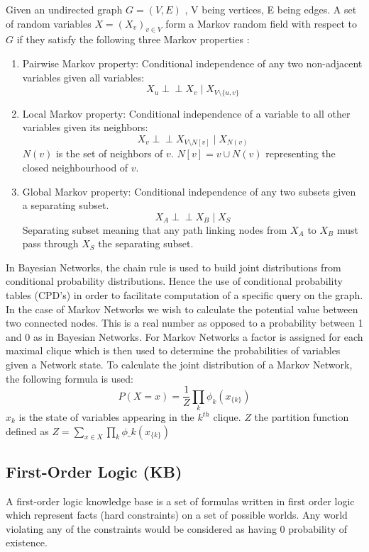 Given an undirected graph \(G = (V,E)\) , V being vertices, E being edges.
A set of random variables \(X = (X_v)_{v\in V}\) form a Markov random field with respect to \(G\) if they satisfy the following three Markov properties \cite{Markovra75:online}:
\begin{enumerate}
\item Pairwise Markov property: Conditional independence of any two non-adjacent variables given all variables: \[X_u \perp\!\!\!\perp X_v \mid X_{V\setminus\{u,v\}}\]
\item Local Markov property: Conditional independence of a variable to all other variables given its neighbors: \[ X_v \perp \!\!\!\perp X_{V\setminus N[v]} \mid X_{N(v)}\] \(N(v)\)  is the set of neighbors of \(v\). \newline\(N[v] = v\cup N(v)\) representing the closed neighbourhood of \(v\).
\item Global Markov property: Conditional independence of any two subsets given a separating subset.
\[X_A \perp \!\!\!\perp X_B \mid X_S \]Separating subset meaning that any path linking nodes from \(X_A\) to \(X_B\) must pass through \(X_S\) the separating subset.
\end{enumerate}

In Bayesian Networks, the chain rule is used to build joint distributions from conditional probability distributions. Hence the use of conditional probability tables (CPD's) in order to facilitate computation of a specific query on the graph. In the case of Markov Networks we wish to calculate the potential value between two connected nodes. This is a real number as opposed to a probability between 1 and 0 as in Bayesian Networks. For Markov Networks a factor is assigned for each maximal clique which is then used to determine the probabilities of variables given a Network state.
To calculate the joint distribution of a Markov Network, the following formula is used: \[P(X=x) = \frac{1}{Z}\prod_k \phi_k(x_{\{k\}})\]
\(x_k\) is the state of variables appearing in the \(k^{th}\) clique.
\(Z\) the partition function defined as \(Z=\sum_{x\in X}\prod_k \phi\_k(x_{\{k\}})\)
\cite{mlj05pdf51:online}
\subsection{First-Order Logic (KB)}
A first-order logic knowledge base is a set of formulas written in first order logic which represent facts (hard constraints) on a set of possible worlds. Any world violating any of the constraints would be considered as having 0 probability of existence. 

